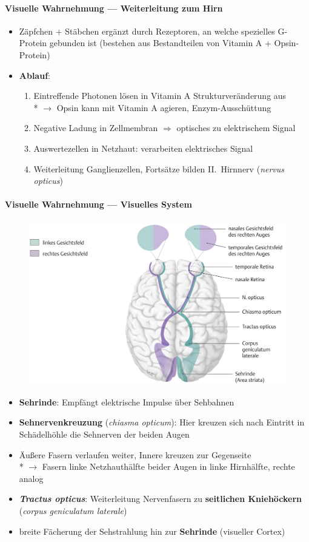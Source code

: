 \paragraph{Visuelle Wahrnehmung --- Weiterleitung zum Hirn}
\begin{itemize}
  \item Zäpfchen + Stäbchen ergänzt durch Rezeptoren, an welche spezielles G-Pro\-tein gebunden ist (bestehen aus Bestandteilen von Vitamin A + Opsin-Protein)
  \item \textbf{Ablauf}:
  \begin{enumerate}
    \item Eintreffende Photonen lösen in Vitamin A Strukturveränderung aus \\* \( \to \) Opsin kann mit Vitamin A agieren, Enzym-Ausschüttung
    \item Negative Ladung in Zellmembran \( \Rightarrow \) optisches zu elektrischem Signal
    \item Auswertezellen in Netzhaut: verarbeiten elektrisches Signal
    \item Weiterleitung Ganglienzellen, Fortsätze bilden II.\ Hirnnerv (\emph{nervus opticus})
  \end{enumerate}
\end{itemize}

\paragraph{Visuelle Wahrnehmung --- Visuelles System}
\begin{figure}[H]
  \centering
  \includegraphics[width=.7\linewidth]{assets/img/visuellesSystem.jpg}
\end{figure}
\begin{itemize}
  \item \textbf{Sehrinde}: Empfängt elektrische Impulse über Sehbahnen
  \item \textbf{Sehnervenkreuzung} (\emph{chiasma opticum}): Hier kreuzen sich nach Eintritt in Schädelhöhle die Sehnerven der beiden Augen
  \item Äußere Fasern verlaufen weiter, Innere kreuzen zur Gegenseite \\* \( \to \) Fasern linke Netzhauthälfte beider Augen in linke Hirnhälfte, rechte analog
  \item \emph{\textbf{Tractus opticus}}: Weiterleitung Nervenfasern zu \textbf{seitlichen Kniehöckern} (\emph{corpus geniculatum laterale})
  \item breite Fächerung der Sehstrahlung hin zur \textbf{Sehrinde} (visueller Cortex)
\end{itemize}

